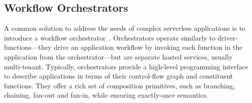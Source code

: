 



\subsection{Workflow Orchestrators}\label{sec:bg:orchestrator}

A common solution to address the needs of complex serverless applications is to
introduce a workflow orchestrator~\cite{excamera, gg-atc, aws-step-functions,
google-cloud-composer, google-workflows, durable-functions}.  Orchestrators
operate similarly to driver-functions---they drive an application workflow by
invoking each function in the application from the orchestrator---but are
separate hosted services, usually multi-tenant. Typically, orchestrators provide
a high-level programming interface to describe applications in terms of their
control-flow graph and constituent functions.  They offer a  rich set of
composition primitives, such as branching, chaining, fan-out and fan-in, while
ensuring exactly-once semantics.

